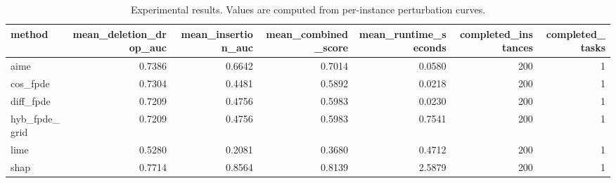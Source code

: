 \begin{table}[t]
\caption{Experimental results. Values are computed from per-instance perturbation curves.}
\label{tab:main_results_computed}
\centering
\begin{tabular}{lrrrrrr}
\toprule
method & mean\_deletion\_drop\_auc & mean\_insertion\_auc & mean\_combined\_score & mean\_runtime\_seconds & completed\_instances & completed\_tasks \\
\midrule
aime & 0.7386 & 0.6642 & 0.7014 & 0.0580 & 200 & 1 \\
cos\_fpde & 0.7304 & 0.4481 & 0.5892 & 0.0218 & 200 & 1 \\
diff\_fpde & 0.7209 & 0.4756 & 0.5983 & 0.0230 & 200 & 1 \\
hyb\_fpde\_grid & 0.7209 & 0.4756 & 0.5983 & 0.7541 & 200 & 1 \\
lime & 0.5280 & 0.2081 & 0.3680 & 0.4712 & 200 & 1 \\
shap & 0.7714 & 0.8564 & 0.8139 & 2.5879 & 200 & 1 \\
\bottomrule
\end{tabular}

\end{table}
